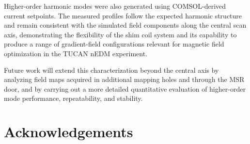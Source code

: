 \documentclass[preprint,12pt]{elsarticle}
\begin{document}
Higher-order harmonic modes were also generated using COMSOL-derived current setpoints. The measured profiles follow the expected harmonic structure and remain consistent with the simulated field components along the central scan axis, demonstrating the flexibility of the shim coil system and its capability to produce a range of gradient-field configurations relevant for magnetic field optimization in the TUCAN nEDM experiment.

Future work will extend this characterization beyond the central axis by analyzing field maps acquired in additional mapping holes and through the MSR door, and by carrying out a more detailed quantitative evaluation of higher-order mode performance, repeatability, and stability.

\section*{Acknowledgements}




\end{document}
